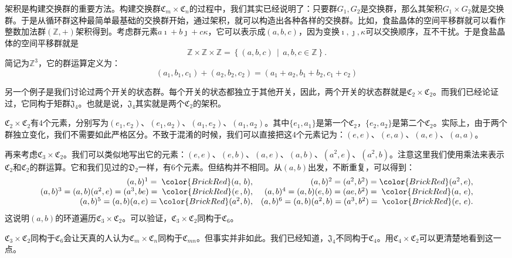\documentclass[12pt,UTF8,fontset=none]{ctexbook}
\begin{document}
架积是构建交换群的重要方法。构建交换群$\mathfrak{C}_m\times \mathfrak{C}_n$的过程中，我们其实已经说明了：只要群$G_1,G_2$是交换群，那么其架积$G_1\times G_2$就是交换群。于是从循环群这种最简单最基础的交换群开始，通过架积，就可以构造出各种各样的交换群。比如，食盐晶体的空间平移群就可以看作整数加法群$(\mathbb{Z},+)$架积得到。考虑群元素$a\imath + b\jmath + c\kappa$，它可以表示成$(a,b,c)$，因为变换$\imath, \jmath, \kappa$可以交换顺序，互不干扰。于是食盐晶体的空间平移群就是
$$\mathbb{Z}\times\mathbb{Z}\times\mathbb{Z} = \left\{(a,b,c)\,\mid\,a,b,c\in\mathbb{Z}\right\}.$$
简记为$\mathbb{Z}^3$，它的群运算定义为：
$$(a_1,b_1,c_1) + (a_2,b_2,c_2) = (a_1+a_2,b_1+b_2,c_1+c_2)
$$

另一个例子是我们讨论过两个开关的状态群。每个开关的状态都独立于其他开关，因此，两个开关的状态群就是$\mathfrak{C}_2\times \mathfrak{C}_2$。而我们已经论证过，它同构于矩群$\mathfrak{J}_4$。也就是说，$\mathfrak{J}_4$其实就是两个$\mathfrak{C}_2$的架积。

$\mathfrak{C}_2\times \mathfrak{C}_2$有$4$个元素，分别写为$(e_1,e_2)$、$(e_1,a_2)$、$(a_1,e_2)$、$(a_1,a_2)$。其中$\{e_1,a_1\}$是第一个$\mathfrak{C}_2$，$\{e_2,a_2\}$是第二个$\mathfrak{C}_2$。实际上，由于两个群独立变化，我们不需要如此严格区分。不致于混淆的时候，我们可以直接把这$4$个元素记为：$(e,e)$、$(e,a)$、$(a,e)$、$(a,a)$。

再来考虑$\mathfrak{C}_3\times \mathfrak{C}_2$。我们可以类似地写出它的元素：$(e,e)$、$(e,b)$、$(a,e)$、$(a,b)$、$(a^2,e)$、$(a^2,b)$。注意这里我们使用乘法来表示$\mathfrak{C}_2$和$\mathfrak{C}_2$的群运算。它和我们见过的$\mathfrak{D}_2$一样，有$6$个元素。但结构并不相同。从$(a,b)$出发，不断重复，可以得到：
\[
\begin{array}{rr}
    (a,b)^1 =\; {\color{BrickRed}(a,\,b)}, &(a,b)^2 = (a^2,b^2) = {\color{BrickRed}(a^2,e)}, \\ (a,b)^3 = (a,b)(a^2,e) = (a^3,be) =\; {\color{BrickRed}(e\,,b)}, &
    (a,b)^4 = (a,b)(e,b) = (ae,b^2) = \;{\color{BrickRed}(a,\,e)}, \\
    (a,b)^5 = (a,b)(a,e) = {\color{BrickRed}(a^2,b)}, & (a,b)^6 = (a,b)(a^2,b) = (a^3,b^2) = \;{\color{BrickRed}(e,\,e)}.
\end{array}
\]
这说明$(a,b)$的环道遍历$\mathfrak{C}_3\times \mathfrak{C}_2$。可以验证，$\mathfrak{C}_3\times \mathfrak{C}_2$同构于$\mathfrak{C}_6$。

$\mathfrak{C}_3\times \mathfrak{C}_2$同构于$\mathfrak{C}_6$会让天真的人认为$\mathfrak{C}_m\times \mathfrak{C}_n$同构于$\mathfrak{C}_{mn}$。但事实并非如此。我们已经知道，$\mathfrak{J}_4$不同构于$\mathfrak{C}_4$。用$\mathfrak{C}_4\times \mathfrak{C}_2$可以更清楚地看到这一点。
\end{document}
